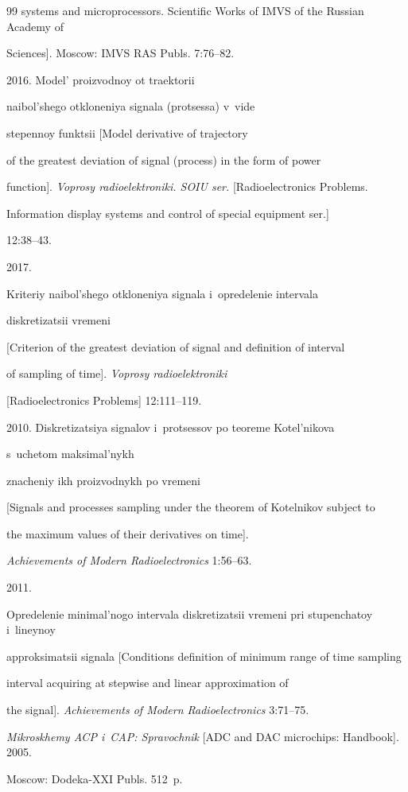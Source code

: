 {{\begin{thebibliography}{99}
systems and microprocessors. Scientific Works of IMVS of the Russian Academy of 


Sciences]. Moscow: IMVS RAS Publs. 7:76--82.




 2016. Model' proizvodnoy ot traektorii 


naibol'shego otkloneniya signala (protsessa) v~vide 


stepennoy funktsii [Model derivative of trajectory 


of the greatest deviation of signal (process) in the form of power 


function]. \textit{Voprosy radioelektroniki. SOIU ser.} [Radioelectronics Problems.


Information display systems and control of special equipment ser.] 


 12:38--43.




 2017. 


Kriteriy naibol'shego otkloneniya signala i~opredelenie intervala 


diskretizatsii vremeni 


[Criterion of the greatest deviation of signal and definition of interval 


of sampling of time]. \textit{Voprosy radioelektroniki} 


[Radioelectronics Problems] 12:111--119.







 2010. Diskretizatsiya signalov i~protsessov po teoreme Kotel'nikova 


s~uchetom maksimal'nykh 


znacheniy ikh proizvodnykh po vremeni 


[Signals and processes sampling under the theorem of Kotelnikov subject to


the maximum values of their derivatives on time].


\textit{Achievements of Modern Radioelectronics} 1:56--63.




 2011. 


Opredelenie minimal'nogo intervala diskretizatsii vremeni pri stupenchatoy i~lineynoy 


approksimatsii signala [Conditions definition of minimum range of time sampling 


interval acquiring at stepwise and linear approximation of 


the signal]. \textit{Achievements of Modern Radioelectronics} 3:71--75.




\textit{Mikroskhemy ACP i~CAP: Spravochnik} [ADC and DAC microchips: Handbook]. 2005. 


Moscow: Dodeka-XXI Publs. 512~p.


\end{thebibliography}


} }
